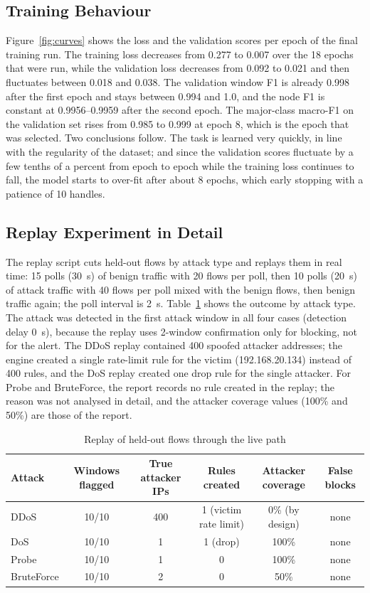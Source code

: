\subsection{Training Behaviour}
Figure~\ref{fig:curves} shows the loss and the validation scores per epoch of the final training run. The training loss decreases from 0.277 to 0.007 over the 18 epochs that were run, while the validation loss decreases from 0.092 to 0.021 and then fluctuates between 0.018 and 0.038. The validation window F1 is already 0.998 after the first epoch and stays between 0.994 and 1.0, and the node F1 is constant at 0.9956--0.9959 after the second epoch. The major-class macro-F1 on the validation set rises from 0.985 to 0.999 at epoch 8, which is the epoch that was selected. Two conclusions follow. The task is learned very quickly, in line with the regularity of the dataset; and since the validation scores fluctuate by a few tenths of a percent from epoch to epoch while the training loss continues to fall, the model starts to over-fit after about 8 epochs, which early stopping with a patience of 10 handles.

\subsection{Replay Experiment in Detail}
The replay script cuts held-out flows by attack type and replays them in real time: 15 polls (30~s) of benign traffic with 20 flows per poll, then 10 polls (20~s) of attack traffic with 40 flows per poll mixed with the benign flows, then benign traffic again; the poll interval is 2~s. Table~\ref{tab:replaydetail} shows the outcome by attack type. The attack was detected in the first attack window in all four cases (detection delay 0~s), because the replay uses 2-window confirmation only for blocking, not for the alert. The DDoS replay contained 400 spoofed attacker addresses; the engine created a single rate-limit rule for the victim (192.168.20.134) instead of 400 rules, and the DoS replay created one drop rule for the single attacker. For Probe and BruteForce, the report records no rule created in the replay; the reason was not analysed in detail, and the attacker coverage values (100\% and 50\%) are those of the report.

\begin{table}[htbp]
\centering
\caption{Replay of held-out flows through the live path}
\label{tab:replaydetail}
\small
\begin{tabular}{|l|c|c|c|c|c|}
\hline
\textbf{Attack} & \textbf{Windows flagged} & \textbf{True attacker IPs} & \textbf{Rules created} & \textbf{Attacker coverage} & \textbf{False blocks} \\ \hline
DDoS & 10/10 & 400 & 1 (victim rate limit) & 0\% (by design) & none \\ \hline
DoS & 10/10 & 1 & 1 (drop) & 100\% & none \\ \hline
Probe & 10/10 & 1 & 0 & 100\% & none \\ \hline
BruteForce & 10/10 & 2 & 0 & 50\% & none \\ \hline
\end{tabular}
\end{table}

